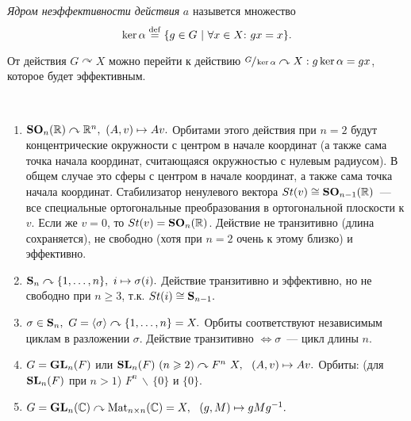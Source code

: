         \begin{definition}
            \textit{Ядром неэффективности действия} $a$ назывется множество 
            \begin{equation*}
                \ker \alpha \stackrel{\mathrm{def}}{=} \{g \in G \ | \ \forall x \in X{:}{ } \  gx = x\}.
            \end{equation*}
        \end{definition}
        \begin{remark}
            От действия ${G \curvearrowright X}$ можно перейти к действию ${\sfrac{G}{\ker \alpha} \curvearrowright X : g \ker \alpha = gx}$, которое будет эффективным.
        \end{remark}
        \begin{exmpls}
            \
            \begin{enumerate}
                \setlength\itemsep{0.1em}
                \item ${\mathbf{SO}_n(\mathbb{R}) \curvearrowright \mathbb{R}^n, \ (A,v) \mapsto Av.}$\n
                Орбитами этого действия при ${n = 2}$ будут концентрические окружности с центром в начале координат (а также сама точка начала координат, считающаяся окружностью с нулевым радиусом). В общем случае это сферы с центром в начале координат, а также сама точка начала координат.\n
                Стабилизатор ненулевого вектора ${St(v) \cong \mathbf{SO}_{n - 1}(\mathbb{R})}$~--- все специальные ортогональные преобразования в ортогональной плоскости к $v$. Если же $v = 0$, то $St(v) = \mathbf{SO}_n(\mathbb{R})$.
                Действие не транзитивно (длина сохраняется), не свободно (хотя при ${n = 2}$ очень к этому близко) и эффективно.
                \item ${\mathbf{S}_n \curvearrowright \{1,\ldots, n\}, \ i \mapsto \sigma(i)}.$ \n
                Действие транзитивно и эффективно, но не свободно при $n \geqslant 3$, т.к. ${St(i) \cong \mathbf{S}_{n-1}.}$ 
                \item ${\sigma \in \mathbf{S}_n, \ G = \langle \sigma \rangle \curvearrowright \{1,\ldots, n\} = X.}$\n
                Орбиты соответствуют независимым циклам в разложении $\sigma$.\newline
                Действие транзитивно $\Leftrightarrow \sigma$~--- цикл длины $n$.
                \item ${G = \mathbf{GL}_n(F)}$ или ${\SL_n(F) \ (n \geqslant 2) \curvearrowright F^n \ X, \ \ (A,v) \mapsto Av.}$\n
                Орбиты: (для ${\mathbf{SL}_n(F)}$ при ${n > 1}$) ${F^n \, \backslash \, \{0\}}$ и $\{0\}$.
                \item ${G = \mathbf{GL}_n(\mathbb{C}) \curvearrowright \mathrm{Mat}_{n \times n}(\mathbb{C}) = X, \ \ (g,M) \mapsto gMg^{-1}.}$\n

\end{enumerate}
\end{exmpls}
